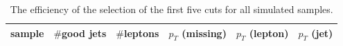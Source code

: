   \begin{table}[H]
    \centering
    \caption{The efficiency of the selection of the first five cuts for all simulated samples.}
    \begin{tabular}{l|lllll}
    sample             & $\#$good jets & $\#$leptons & $p_T$ (missing) &  $p_T$ (lepton)    & $p_T$ (jet)   \\
    \hline

\end{tabular}
\end{table}
